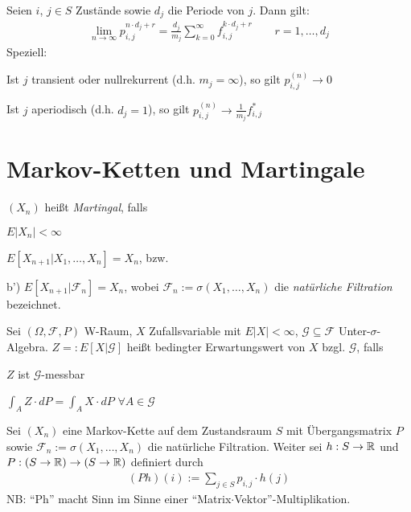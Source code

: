 \documentclass[a4paper,twoside,DIV15,BCOR12mm]{scrbook}
\newcommand{\cF}{\mathcal F}
\begin{document}
\begin{satz}
  Seien $i$, $j \in S$ Zustände sowie $d_j$ die Periode von $j$. Dann gilt:
  \begin{align*}
    \lim_{n \rightarrow \infty} p_{i,j}^{n \cdot d_j + r} = \frac{d_j}{m_j} \sum_{k=0}^\infty f_{i,j}^{k \cdot d_j + r} \qquad r=1,\ldots,d_j
  \end{align*}
  Speziell:
  \begin{enuma}
  \item Ist $j$ transient oder nullrekurrent (d.h. $m_j = \infty$), so gilt $p_{i,j}^{(n)} \longrightarrow 0$
  \item Ist $j$ aperiodisch (d.h. $d_j = 1$), so gilt $p_{i,j}^{(n)} \longrightarrow \frac{1}{m_j} f_{i,j}^*$
  \end{enuma}
\end{satz}


\section{Markov-Ketten und Martingale}

\begin{erinnerung}
  $(X_n)$ heißt \emph{Martingal}, falls
  \begin{enuma}
  \item $E|X_n| < \infty$
  \item $E[X_{n+1}|X_1,\ldots,X_n] = X_n$, bzw.
  \item[b')] $E[X_{n+1}|\cF_n] = X_n$, wobei $\cF_n := \sigma(X_1, \ldots, X_n)$ die \emph{natürliche Filtration} bezeichnet.
  \end{enuma}
\end{erinnerung}

\begin{erinnerung}
  Sei $(\Omega, \cF, P)$ W-Raum, $X$ Zufallsvariable mit $E|X| < \infty$, $\mathcal{G} \subseteq \cF$ Unter-$\sigma$-Algebra.
  $Z =: E[X|\mathcal{G}]$ heißt bedingter Erwartungswert von $X$ bzgl. $\mathcal{G}$, falls
  \begin{enuma}
  \item $Z$ ist $\mathcal{G}$-messbar
  \item $\int_A Z \cdot dP = \int_A X \cdot dP$ \quad $\forall A \in \mathcal{G}$
  \end{enuma}
\end{erinnerung}

Sei $(X_n)$ eine Markov-Kette auf dem Zustandsraum $S$ mit Übergangsmatrix $P$ sowie $\cF_n := \sigma(X_1,\ldots,X_n)$ die natürliche
Filtration. Weiter sei $h: S \rightarrow \mathbb{R}$ und $P: (S \rightarrow \mathbb{R}) \rightarrow (S \rightarrow \mathbb{R})$ definiert durch
\begin{align*}
  (Ph)(i) := \sum_{j \in S} p_{i,j} \cdot h(j)
\end{align*}
NB: ``Ph'' macht Sinn im Sinne einer ``Matrix$\cdot$Vektor''-Multiplikation.
\end{document}
